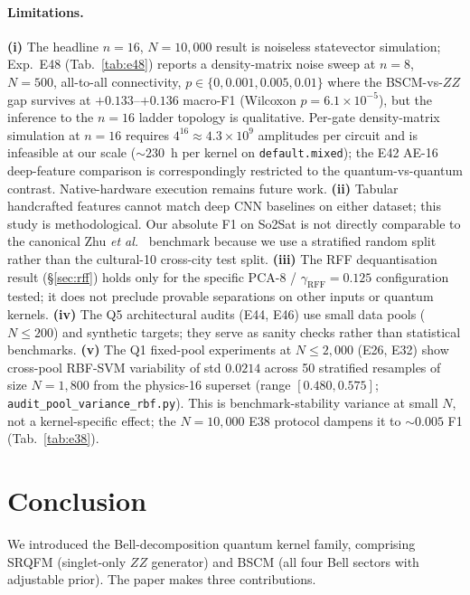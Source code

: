 \documentclass[pdflatex,sn-mathphys]{sn-jnl}
\theoremstyle{plain}
\theoremstyle{remark}
\theoremstyle{definition}
\begin{document}
\paragraph{Limitations.}
\textbf{(i)} The headline $n=16$, $N=10{,}000$ result is noiseless statevector simulation; Exp.\ E48 (Tab.~\ref{tab:e48}) reports a density-matrix noise sweep at $n=8$, $N=500$, all-to-all connectivity, $p\in\{0, 0.001, 0.005, 0.01\}$ where the BSCM-vs-$ZZ$ gap survives at $+0.133$--$+0.136$ macro-F1 (Wilcoxon $p\!=\!6.1\!\times\!10^{-5}$), but the inference to the $n=16$ ladder topology is qualitative.  Per-gate density-matrix simulation at $n=16$ requires $4^{16}\!\approx\!4.3\times 10^{9}$ amplitudes per circuit and is infeasible at our scale ($\sim\!230$~h per kernel on \texttt{default.mixed}); the E42 AE-16 deep-feature comparison is correspondingly restricted to the quantum-vs-quantum contrast.  Native-hardware execution remains future work.
\textbf{(ii)} Tabular handcrafted features cannot match deep CNN baselines on either dataset; this study is methodological.  Our absolute F1 on So2Sat is not directly comparable to the canonical Zhu \emph{et al.}\ \cite{zhu2020} benchmark because we use a stratified random split rather than the cultural-10 cross-city test split.
\textbf{(iii)} The RFF dequantisation result (\S\ref{sec:rff}) holds only for the specific PCA-8 / $\gamma_\mathrm{RFF}=0.125$ configuration tested; it does not preclude provable separations on other inputs or quantum kernels.
\textbf{(iv)} The Q5 architectural audits (E44, E46) use small data pools ($N\le 200$) and synthetic targets; they serve as sanity checks rather than statistical benchmarks.
\textbf{(v)} The Q1 fixed-pool experiments at $N\!\le\!2{,}000$ (E26, E32) show cross-pool RBF-SVM variability of std $0.0214$ across 50 stratified resamples of size $N=1{,}800$ from the physics-16 superset (range $[0.480, 0.575]$; \texttt{audit\_pool\_variance\_rbf.py}).  This is benchmark-stability variance at small $N$, not a kernel-specific effect; the $N=10{,}000$ E38 protocol dampens it to $\sim\!0.005$ F1 (Tab.~\ref{tab:e38}).

\section{Conclusion}\label{sec:conclusion}

We introduced the Bell-decomposition quantum kernel family, comprising SRQFM (singlet-only $ZZ$ generator) and BSCM (all four Bell sectors with adjustable prior). The paper makes three contributions.
\end{document}
